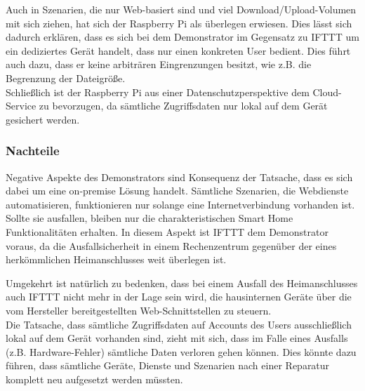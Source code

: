 Auch in Szenarien, die nur Web-basiert sind und viel Download/Upload-Volumen mit sich ziehen, hat sich der Raspberry Pi als überlegen erwiesen. Dies lässt sich dadurch erklären, dass es sich bei dem Demonstrator im Gegensatz zu IFTTT um ein dediziertes Gerät handelt, dass nur einen konkreten User bedient. Dies führt auch dazu, dass er keine arbiträren Eingrenzungen besitzt, wie z.B. die Begrenzung der Dateigröße.\\


Schließlich ist der Raspberry Pi aus einer Datenschutzperspektive dem Cloud-Service zu bevorzugen, da sämtliche Zugriffsdaten nur lokal auf dem Gerät gesichert werden.

\subsubsection{Nachteile}
Negative Aspekte des Demonstrators sind Konsequenz der Tatsache, dass es sich dabei um eine on-premise Lösung handelt. Sämtliche Szenarien, die Webdienste automatisieren, funktionieren nur solange eine Internetverbindung  vorhanden ist. Sollte sie ausfallen, bleiben nur die charakteristischen Smart Home Funktionalitäten erhalten. In diesem Aspekt ist IFTTT dem Demonstrator voraus, da die Ausfallsicherheit in einem Rechenzentrum gegenüber der eines herkömmlichen Heimanschlusses weit überlegen ist.

Umgekehrt ist natürlich zu bedenken, dass bei einem Ausfall des Heimanschlusses auch IFTTT nicht mehr in der Lage sein wird, die hausinternen Geräte über die vom Hersteller bereitgestellten Web-Schnittstellen zu steuern. \\

Die Tatsache, dass sämtliche Zugriffsdaten auf Accounts des Users ausschließlich lokal auf dem Gerät vorhanden sind, zieht mit sich, dass im Falle eines Ausfalls (z.B. Hardware-Fehler) sämtliche Daten verloren gehen können. Dies könnte dazu führen, dass sämtliche Geräte, Dienste und Szenarien nach einer Reparatur komplett neu aufgesetzt werden müssten.



